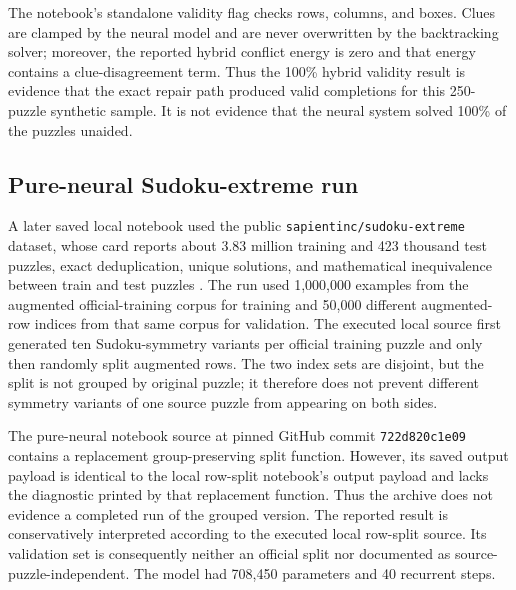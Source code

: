 \documentclass[11pt,oneside]{book}
\theoremstyle{remark}
\begin{document}
The notebook's standalone validity flag checks rows, columns, and boxes. Clues
are clamped by the neural model and are never overwritten by the backtracking
solver; moreover, the reported hybrid conflict energy is zero and that energy
contains a clue-disagreement term. Thus the 100\% hybrid validity result is
evidence that the exact repair path produced valid completions for this
250-puzzle synthetic sample. It is not evidence that the neural system solved
100\% of the puzzles unaided.

\subsection{Pure-neural Sudoku-extreme run}

A later saved local notebook used the public
\texttt{sapientinc/sudoku-extreme} dataset, whose card reports about
3.83 million training and 423 thousand test puzzles, exact deduplication,
unique solutions, and mathematical inequivalence between train and test
puzzles \cite{SapientSudokuExtreme2026,FalkenburgSudokuLocalBundle2026}. The
run used 1,000,000 examples from the augmented official-training corpus for
training and 50,000 different augmented-row indices from that same corpus for
validation. The executed local source first generated ten Sudoku-symmetry
variants per official training puzzle and only then randomly split augmented
rows. The two index sets are disjoint, but the split is not grouped by
original puzzle; it therefore does not prevent different symmetry variants
of one source puzzle from appearing on both sides.

The pure-neural notebook source at pinned GitHub commit
\texttt{722d820c1e09} contains a replacement group-preserving split function.
However, its saved output payload is identical to the local row-split
notebook's output payload and lacks the diagnostic printed by that replacement
function. Thus the archive does not evidence a completed run of the grouped
version. The reported result is conservatively interpreted according to the
executed local row-split source. Its validation set is consequently neither
an official split nor documented as source-puzzle-independent. The model had
708,450 parameters and 40 recurrent steps.
\end{document}
